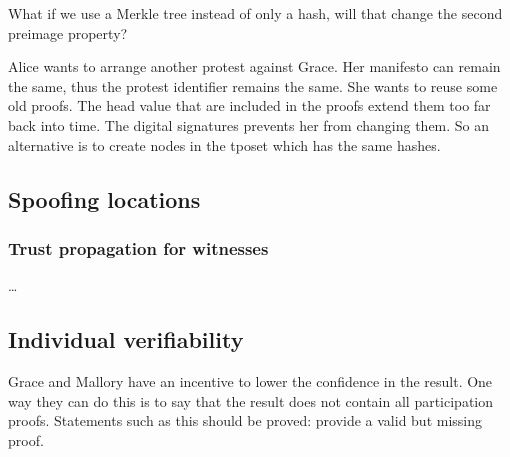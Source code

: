 \begin{question}
  What if we use a Merkle tree instead of only a hash, will that change the 
  second preimage property?
\end{question}

Alice wants to arrange another protest against Grace.
Her manifesto can remain the same, thus the protest identifier remains the 
same.
She wants to reuse some old proofs.
The head value that are included in the proofs extend them too far back into 
time.
The digital signatures prevents her from changing them.
So an alternative is to create nodes in the \ac{tposet} which has the same 
hashes.

\subsection{Spoofing locations}

\subsubsection{Trust propagation for witnesses}

\dots

\subsection{Individual verifiability}

Grace and Mallory have an incentive to lower the confidence in the result.
One way they can do this is to say that the result does not contain all 
participation proofs.
Statements such as this should be proved: provide a valid but missing proof.


